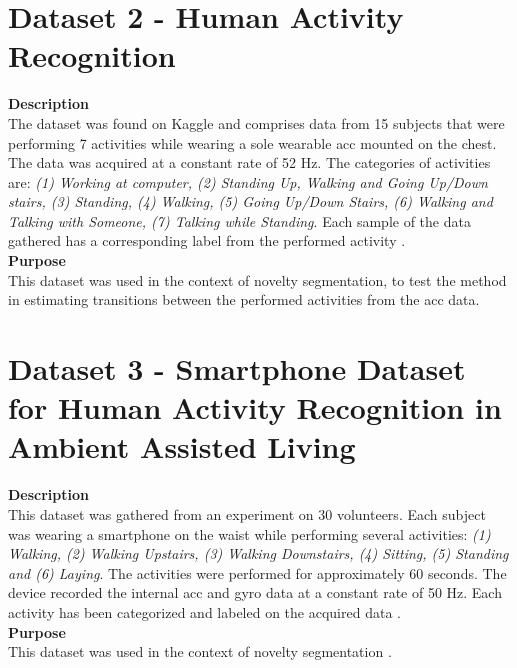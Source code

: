\section{Dataset 2 - Human Activity Recognition}
\label{dat:dataset2}
\textbf{Description}\hfill\\
The dataset was found on Kaggle and comprises data from 15 subjects that were performing 7 activities while wearing a sole wearable \gls{acc} mounted on the chest. The data was acquired at a constant rate of 52 Hz. The categories of activities are: \textit{(1) Working at computer, (2) Standing Up, Walking and Going Up/Down stairs, (3) Standing, (4) Walking, (5) Going Up/Down Stairs, (6) Walking and Talking with Someone, (7) Talking while Standing}. Each sample of the data gathered has a corresponding label from the performed activity \cite{dataset1}.\\
\textbf{Purpose}\hfill\\
This dataset was used in the context of novelty segmentation, to test the method in estimating transitions between the performed activities from the \gls{acc} data. 
 


\section{Dataset 3 - Smartphone Dataset for Human Activity Recognition in Ambient Assisted Living}
\label{dat:dataset3}
\textbf{Description}\hfill\\
This dataset was gathered from an experiment on 30 volunteers. Each subject was wearing a smartphone on the waist while performing several activities: \textit{(1) Walking, (2) Walking Upstairs, (3) Walking Downstairs, (4) Sitting, (5) Standing and (6) Laying}. The activities were performed for approximately 60 seconds. The device recorded the internal \gls{acc} and \gls{gyro} data at a constant rate of 50 Hz. Each activity has been categorized and labeled on the acquired data \cite{dataset2, dataset2_2}.\\
\textbf{Purpose}\hfill\\
This dataset was used in the context of novelty segmentation \cite{dataset2, dataset2_2}.

